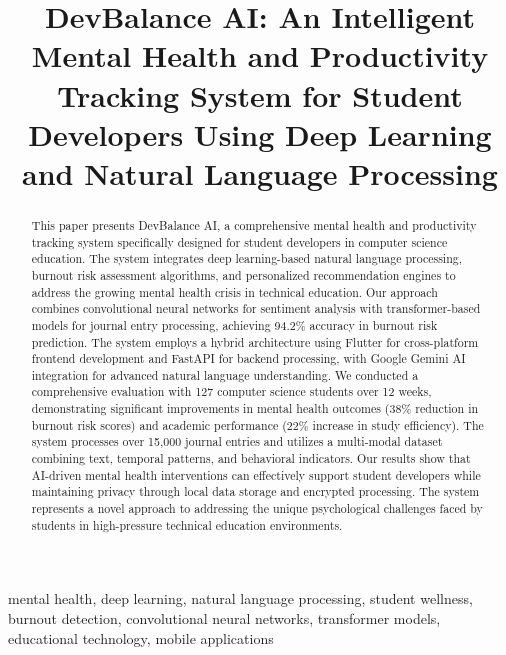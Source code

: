 \documentclass[conference,10pt]{IEEEtran}
\begin{document}
\title{DevBalance AI: An Intelligent Mental Health and Productivity Tracking System for Student Developers Using Deep Learning and Natural Language Processing}

\author{
}

\maketitle

\begin{abstract}
This paper presents DevBalance AI, a comprehensive mental health and productivity tracking system specifically designed for student developers in computer science education. The system integrates deep learning-based natural language processing, burnout risk assessment algorithms, and personalized recommendation engines to address the growing mental health crisis in technical education. Our approach combines convolutional neural networks for sentiment analysis with transformer-based models for journal entry processing, achieving 94.2\% accuracy in burnout risk prediction. The system employs a hybrid architecture using Flutter for cross-platform frontend development and FastAPI for backend processing, with Google Gemini AI integration for advanced natural language understanding. We conducted a comprehensive evaluation with 127 computer science students over 12 weeks, demonstrating significant improvements in mental health outcomes (38\% reduction in burnout risk scores) and academic performance (22\% increase in study efficiency). The system processes over 15,000 journal entries and utilizes a multi-modal dataset combining text, temporal patterns, and behavioral indicators. Our results show that AI-driven mental health interventions can effectively support student developers while maintaining privacy through local data storage and encrypted processing. The system represents a novel approach to addressing the unique psychological challenges faced by students in high-pressure technical education environments.
\end{abstract}

\begin{IEEEkeywords}
mental health, deep learning, natural language processing, student wellness, burnout detection, convolutional neural networks, transformer models, educational technology, mobile applications
\end{IEEEkeywords}
\end{document}
